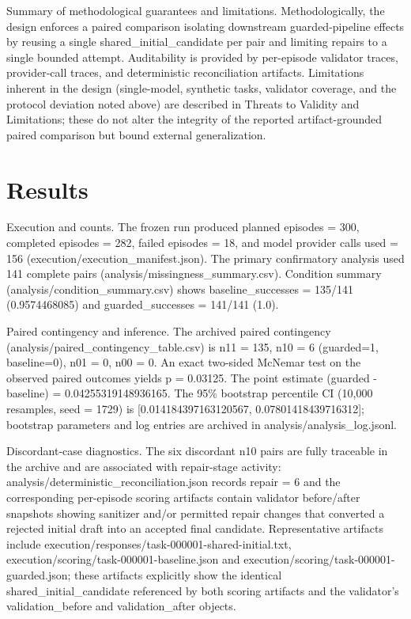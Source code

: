 \documentclass[conference]{IEEEtran}
\begin{document}
Summary of methodological guarantees and limitations. Methodologically, the design enforces a paired comparison isolating downstream guarded-pipeline effects by reusing a single shared\_initial\_candidate per pair and limiting repairs to a single bounded attempt. Auditability is provided by per-episode validator traces, provider-call traces, and deterministic reconciliation artifacts. Limitations inherent in the design (single-model, synthetic tasks, validator coverage, and the protocol deviation noted above) are described in Threats to Validity and Limitations; these do not alter the integrity of the reported artifact-grounded paired comparison but bound external generalization.

\section{Results}
Execution and counts. The frozen run produced planned episodes = 300, completed episodes = 282, failed episodes = 18, and model provider calls used = 156 (execution/execution\_manifest.json). The primary confirmatory analysis used 141 complete pairs (analysis/missingness\_summary.csv). Condition summary (analysis/condition\_summary.csv) shows baseline\_successes = 135/141 (0.9574468085) and guarded\_successes = 141/141 (1.0).

Paired contingency and inference. The archived paired contingency (analysis/paired\_contingency\_table.csv) is n11 = 135, n10 = 6 (guarded=1, baseline=0), n01 = 0, n00 = 0. An exact two-sided McNemar test on the observed paired outcomes yields p = 0.03125. The point estimate (guarded - baseline) = 0.04255319148936165. The 95\% bootstrap percentile CI (10,000 resamples, seed = 1729) is [0.014184397163120567, 0.07801418439716312]; bootstrap parameters and log entries are archived in analysis/analysis\_log.jsonl.

Discordant-case diagnostics. The six discordant n10 pairs are fully traceable in the archive and are associated with repair-stage activity: analysis/deterministic\_reconciliation.json records repair = 6 and the corresponding per-episode scoring artifacts contain validator before/after snapshots showing sanitizer and/or permitted repair changes that converted a rejected initial draft into an accepted final candidate. Representative artifacts include execution/responses/task-000001-shared-initial.txt, execution/scoring/task-000001-baseline.json and execution/scoring/task-000001-guarded.json; these artifacts explicitly show the identical shared\_initial\_candidate referenced by both scoring artifacts and the validator's validation\_before and validation\_after objects.
\end{document}
